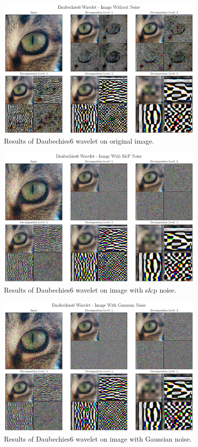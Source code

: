 \documentclass[12pt]{article}
\begin{document}
	\begin{figure}[!h]
		\centering
		\includegraphics[height=7cm]{../Tests/Outputs/2D_Daubechies6Wavelet_WithoutNoise.pdf}
		\caption{Results of Daubechies6 wavelet on original image.}
		\label{fig:2d_db6}
	\end{figure}
	
	\begin{figure}[!h]
		\centering
		\includegraphics[height=7cm]{../Tests/Outputs/2D_Daubechies6Wavelet_SPNoise.pdf}
		\caption{Results of Daubechies6 wavelet on image with s\&p noise.}
		\label{fig:2d_db6_sp}
	\end{figure}
	
	\begin{figure}[!h]
		\centering
		\includegraphics[height=7cm]{../Tests/Outputs/2D_Daubechies6Wavelet_GaussianNoise.pdf}
		\caption{Results of Daubechies6 wavelet on image with Gaussian noise.}
		\label{fig:2d_db6_gs}
	\end{figure}
	
\end{document}
